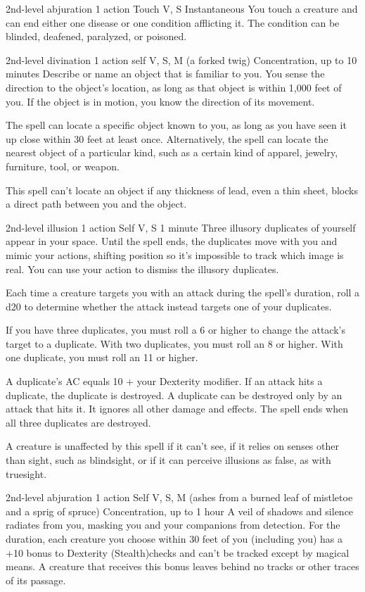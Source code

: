 \documentclass[10pt,twoside,twocolumn,openany]{book}
\begin{document}
{2nd-level abjuration}
{\color{action}1 action}
{Touch}
{V, S}
{Instantaneous}
%
You touch a creature and can end either one disease or one condition afflicting it. The condition can be blinded, deafened, paralyzed, or poisoned.

{2nd-level divination}
{\color{action}1 action}
{self}
{V, S, M (a forked twig)}
{{\color{concentration}Concentration}, up to 10 minutes}
%
Describe or name an object that is familiar to you. You sense the direction to the object's location, as long as that object is within 1,000 feet of you. If the object is in motion, you know the direction of its movement.

The spell can locate a specific object known to you, as long as you have seen it up close within 30 feet at least once. Alternatively, the spell can locate the nearest object of a particular kind, such as a certain kind of apparel, jewelry, furniture, tool, or weapon.

This spell can't locate an object if any thickness of lead, even a thin sheet, blocks a direct path between you and the object.

{2nd-level illusion}
{\color{action} 1 action}
{Self}
{V, S}
{1 minute}
%
Three illusory duplicates of yourself appear in your space. Until the spell ends, the duplicates move with you and mimic your actions, shifting position so it's impossible to track which image is real. You can use your action to dismiss the illusory duplicates.

Each time a creature targets you with an attack during the spell's duration, roll a d20 to determine whether the attack instead targets one of your duplicates.

If you have three duplicates, you must roll a 6 or higher to change the attack's target to a duplicate. With two duplicates, you must roll an 8 or higher. With one duplicate, you must roll an 11 or higher.

A duplicate's AC equals 10 + your Dexterity modifier. If an attack hits a duplicate, the duplicate is destroyed. A duplicate can be destroyed only by an attack that hits it. It ignores all other damage and effects. The spell ends when all three duplicates are destroyed.

A creature is unaffected by this spell if it can't see, if it relies on senses other than sight, such as blindsight, or if it can perceive illusions as false, as with truesight.

{2nd-level abjuration}
{\color{action} 1 action}
{Self}
{V, S, M (ashes from a burned leaf of mistletoe and a sprig of spruce)}
{{\color{concentration}Concentration}, up to 1 hour}
%
A veil of shadows and silence radiates from you, masking you and your companions from detection. For the duration, each creature you choose within 30 feet of you (including you) has a +10 bonus to Dexterity (Stealth)checks and can't be tracked except by magical means. A creature that receives this bonus leaves behind no tracks or other traces of its passage.
\end{document}
